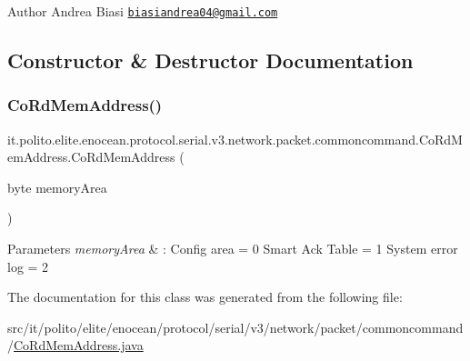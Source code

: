 \begin{DoxyAuthor}{Author}
Andrea Biasi \href{mailto:biasiandrea04@gmail.com}{\tt biasiandrea04@gmail.\+com} 
\end{DoxyAuthor}


\subsection{Constructor \& Destructor Documentation}
\hypertarget{classit_1_1polito_1_1elite_1_1enocean_1_1protocol_1_1serial_1_1v3_1_1network_1_1packet_1_1commoncommand_1_1_co_rd_mem_address_a8645b9ea904c6bd82eb7fd283157d0b8}{}\label{classit_1_1polito_1_1elite_1_1enocean_1_1protocol_1_1serial_1_1v3_1_1network_1_1packet_1_1commoncommand_1_1_co_rd_mem_address_a8645b9ea904c6bd82eb7fd283157d0b8} 
\subsubsection{\texorpdfstring{Co\+Rd\+Mem\+Address()}{CoRdMemAddress()}}
{\footnotesize\ttfamily it.\+polito.\+elite.\+enocean.\+protocol.\+serial.\+v3.\+network.\+packet.\+commoncommand.\+Co\+Rd\+Mem\+Address.\+Co\+Rd\+Mem\+Address (\begin{DoxyParamCaption}\item[{byte}]{memory\+Area }\end{DoxyParamCaption})}


\begin{DoxyParams}{Parameters}
{\em memory\+Area} & \+: Config area = 0 Smart Ack Table = 1 System error log = 2 \\
\hline
\end{DoxyParams}


The documentation for this class was generated from the following file\+:\begin{DoxyCompactItemize}
\item 
src/it/polito/elite/enocean/protocol/serial/v3/network/packet/commoncommand/\hyperlink{_co_rd_mem_address_8java}{Co\+Rd\+Mem\+Address.\+java}\end{DoxyCompactItemize}

